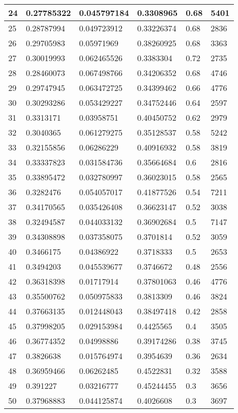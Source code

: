 \begin{longtable}{|l|l|l|l|l|l|}
24 & 0.27785322 & 0.045797184 & 0.3308965 & 0.68 & 5401 \\ \hline 
25 & 0.28787994 & 0.049723912 & 0.33226374 & 0.68 & 2836 \\ \hline 
26 & 0.29705983 & 0.05971969 & 0.38260925 & 0.68 & 3363 \\ \hline 
27 & 0.30019993 & 0.062465526 & 0.3383304 & 0.72 & 2735 \\ \hline 
28 & 0.28460073 & 0.067498766 & 0.34206352 & 0.68 & 4746 \\ \hline 
29 & 0.29747945 & 0.063472725 & 0.34399462 & 0.66 & 4776 \\ \hline 
30 & 0.30293286 & 0.053429227 & 0.34752446 & 0.64 & 2597 \\ \hline 
31 & 0.3313171 & 0.03958751 & 0.40450752 & 0.62 & 2979 \\ \hline 
32 & 0.3040365 & 0.061279275 & 0.35128537 & 0.58 & 5242 \\ \hline 
33 & 0.32155856 & 0.06286229 & 0.40916932 & 0.58 & 3819 \\ \hline 
34 & 0.33337823 & 0.031584736 & 0.35664684 & 0.6 & 2816 \\ \hline 
35 & 0.33895472 & 0.032780997 & 0.36023015 & 0.58 & 2565 \\ \hline 
36 & 0.3282476 & 0.054057017 & 0.41877526 & 0.54 & 7211 \\ \hline 
37 & 0.34170565 & 0.035426408 & 0.36623147 & 0.52 & 3038 \\ \hline 
38 & 0.32494587 & 0.044033132 & 0.36902684 & 0.5 & 7147 \\ \hline 
39 & 0.34308898 & 0.037358075 & 0.3701814 & 0.52 & 3059 \\ \hline 
40 & 0.3466175 & 0.04386922 & 0.3718333 & 0.5 & 2653 \\ \hline 
41 & 0.3494203 & 0.045539677 & 0.3746672 & 0.48 & 2556 \\ \hline 
42 & 0.36318398 & 0.01717914 & 0.37801063 & 0.46 & 4776 \\ \hline 
43 & 0.35500762 & 0.050975833 & 0.3813309 & 0.46 & 3824 \\ \hline 
44 & 0.37663135 & 0.012448043 & 0.38497418 & 0.42 & 2858 \\ \hline 
45 & 0.37998205 & 0.029153984 & 0.4425565 & 0.4 & 3505 \\ \hline 
46 & 0.36774352 & 0.04998886 & 0.39174286 & 0.38 & 3745 \\ \hline 
47 & 0.3826638 & 0.015764974 & 0.3954639 & 0.36 & 2634 \\ \hline 
48 & 0.36959466 & 0.06262485 & 0.4522831 & 0.32 & 3588 \\ \hline 
49 & 0.391227 & 0.03216777 & 0.45244455 & 0.3 & 3656 \\ \hline 
50 & 0.37968883 & 0.044125874 & 0.4026608 & 0.3 & 3697 \\ \hline 
\end{longtable}